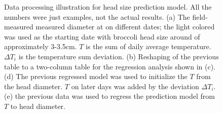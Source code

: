 \begin{figure}[htb]
  \begin{center}
  \end{center}
  \caption[Data processing illustration for head size prediction model]{
    Data processing illustration for head size prediction model. All the numbers were just examples, not the actual results. 
    (a) The field-measured measured diameter at on different dates; the light colored was used as the starting date with broccoli head size around of approximately 3-3.5cm. $T$ is the sum of daily average temperature. $\Delta T_i$ is the temperature sum deviation. 
    (b) Reshaping of the previous table to a two-column table for the regression analysis shown in (c). 
    (d) The previous regressed model was used to initialize the $T$ from the head diameter. 
    $T$ on later days was added by the deviation $\Delta T_i$. 
    (e) the previous data was used to regress the prediction model from $T$ to head diameter.
  }
  \label{fig:bros3}
\end{figure}